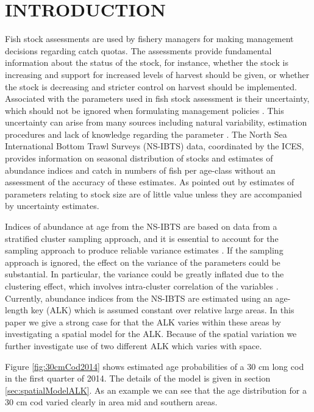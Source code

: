 \documentclass[a4paper 12pt]{article}
\numberwithin{equation}{section}
\begin{document}
\clearpage
\section{\large INTRODUCTION}
Fish stock assessments are used by fishery managers for making management decisions regarding catch quotas. The assessments provide fundamental information about the status of the stock, for instance, whether the stock is increasing and support for increased levels of harvest should be given, or whether the stock is decreasing and stricter control on harvest should be implemented. Associated with the parameters used in fish stock assessment is their uncertainty, which should not be ignored when formulating management policies \citep{walters1981effects, ludwig1981measurement}. This uncertainty can arise from many sources including natural variability, estimation procedures and lack of knowledge regarding the parameter \citep{ehrhardt1997role}. The North Sea International Bottom Trawl Surveys (NS-IBTS) data, coordinated by the ICES, provides information on seasonal distribution of stocks and estimates of abundance indices and catch in numbers of fish per age-class without an assessment of the accuracy of these estimates.  As pointed out by  \citet{ludwig1981measurement} estimates of parameters relating to stock size are of little value unless they are accompanied by uncertainty estimates. 

Indices of abundance at age from the NS-IBTS  are based on data from a stratified cluster sampling approach,  and  it is essential to account for the sampling approach to produce reliable variance estimates \citep{lehtonen2004practical}. If the sampling approach is ignored, the effect on the variance of the parameters could be substantial. In particular, the variance could be greatly inflated  due to the clustering effect, which involves intra-cluster correlation of the variables \citep{aanes2015efficient, lehtonen2004practical}. Currently, abundance indices from the NS-IBTS are estimated using an age-length key (ALK) which is assumed constant over relative large areas. In this paper we give a strong case for that the ALK varies within these areas by investigating a spatial model for the ALK. Because of the spatial variation we further investigate use of two different ALK which varies with space.

Figure \ref{fig:30cmCod2014} shows estimated age probabilities of a 30 cm long cod in the first quarter of 2014. The details of the model is given in section \ref{sec:spatialModelALK}. As an example we can see that the age distribution for a 30 cm cod varied clearly in area mid and southern areas. 
\end{document}
